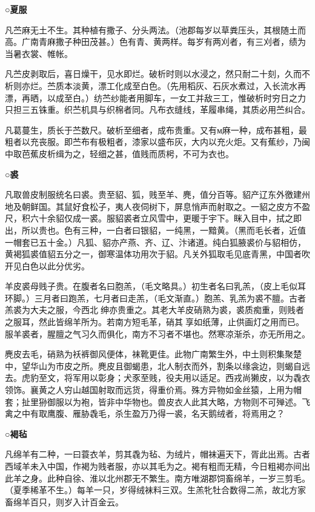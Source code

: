 \documentclass[]{article}
\begin{document}
\textbf{○夏服}

凡苎麻无土不生。其种植有撒子、分头两法。（池郡每岁以草粪压头，其根随土而高。广南青麻撒子种田茂甚。）色有青、黄两样。每岁有两刈者，有三刈者，绩为当暑衣裳、帷帐。

凡苎皮剥取后，喜日燥干，见水即烂。破析时则以水浸之，然只耐二十刻，久而不析则亦烂。苎质本淡黄，漂工化成至白色。（先用稻灰、石灰水煮过，入长流水再漂，再晒，以成至白。）纺苎纱能者用脚车，一女工并敌三工，惟破析时穷日之力只担三五铢重。织苎机具与织棉者同。凡布衣缝线，革履串绳，其质必用苎纠合。

凡葛蔓生，质长于苎数尺。破析至细者，成布贵重。又有м麻一种，成布甚粗，最粗者以充丧服。即苎布有极粗者，漆家以盛布灰，大内以充火炬。又有蕉纱，乃闽中取芭蕉皮析缉为之，轻细之甚，值贱而质枵，不可为衣也。

\textbf{○裘}

凡取兽皮制服统名曰裘。贵至貂、狐，贱至羊、麂，值分百等。貂产辽东外徼建州地及朝鲜国。其鼠好食松子，夷人夜伺树下，屏息悄声而射取之。一貂之皮方不盈尺，积六十余貂仅成一裘。服貂裘者立风雪中，更暖于宇下。眯入目中，拭之即出，所以贵也。色有三种，一白者曰银貂，一纯黑，一黯黄。（黑而毛长者，近值一帽套已五十金。）凡狐、貂亦产燕、齐、辽、汴诸道。纯白狐腋裘价与貂相仿，黄褐狐裘值貂五分之一，御寒温体功用次于貂。凡关外狐取毛见底青黑，中国者吹开见白色以此分优劣。

羊皮裘母贱子贵。在腹者名曰胞羔，（毛文略具。）初生者名曰乳羔，（皮上毛似耳环脚。）三月者曰跑羔，七月者曰走羔，（毛文渐直。）胞羔、乳羔为裘不膻。古者羔裘为大夫之服，今西北绅亦贵重之。其老大羊皮硝熟为裘，裘质痴重，则贱者之服耳，然此皆绵羊所为。若南方短毛革，硝其享如纸薄，止供画灯之用而已。服羊裘者，腥膻之气习久而俱化，南方不习者不堪也。然寒凉渐杀，亦无所用之。

麂皮去毛，硝熟为袄裤御风便体，袜靴更佳。此物广南繁生外，中土则积集聚楚中，望华山为市皮之所。麂皮且御蝎患，北人制衣而外，割条以缘衾边，则蝎自远去。虎豹至文，将军用以彰身；犬豕至贱，役夫用以适足。西戎尚獭皮，以为毳衣领饰。襄黄之人穷山越国射取而远货，得重价焉。殊方异物如金丝猿，上用为帽套；扯里狲御服以为袍，皆非中华物也。兽皮衣人此其大略，方物则不可殚述。飞禽之中有取鹰腹、雁胁毳毛，杀生盈万乃得一裘，名天鹅绒者，将焉用之？

\textbf{○褐毡}

凡绵羊有二种，一曰蓑衣羊，剪其毳为毡、为绒片，帽袜遍天下，胥此出焉。古者西域羊未入中国，作褐为贱者服，亦以其毛为之。褐有粗而无精，今日粗褐亦间出此羊之身。此种自徐、淮以北州郡无不繁生。南方唯湖郡饲畜绵羊，一岁三剪毛。（夏季稀革不生。）每羊一只，岁得绒袜料三双。生羔牝牡合数得二羔，故北方家畜绵羊百只，则岁入计百金云。
\end{document}

